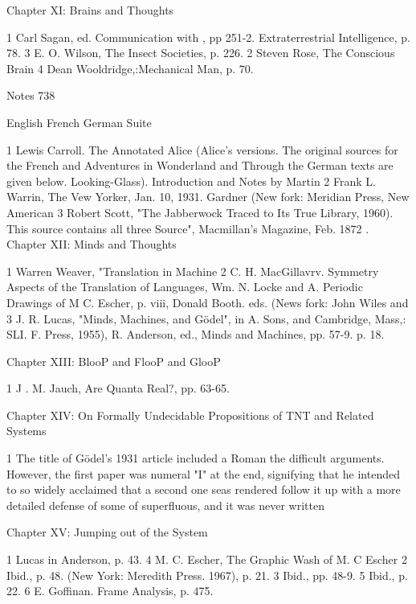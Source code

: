                                    Chapter XI: Brains and Thoughts

1 Carl Sagan, ed. Communication with                      , pp 251-2.
Extraterrestrial Intelligence, p. 78.                     3 E. O. Wilson, The Insect Societies, p. 226.
2 Steven Rose, The Conscious Brain                        4 Dean Wooldridge,:Mechanical Man, p. 70.




Notes                                                                                                 738

                                      English French German Suite

1 Lewis Carroll. The Annotated Alice (Alice's      versions. The original sources for the French and
Adventures in Wonderland and Through the           German texts are given below.
Looking-Glass). Introduction and Notes by Martin   2 Frank L. Warrin, The Vew Yorker, Jan. 10, 1931.
Gardner (New fork: Meridian Press, New American 3 Robert Scott, "The Jabberwock Traced to Its True
Library, 1960). This source contains all three     Source", Macmillan's Magazine, Feb. 1872
.
                                   Chapter XII: Minds and Thoughts

1 Warren Weaver, "Translation     in Machine          2 C. H. MacGillavrv. Symmetry Aspects of the
Translation of Languages, Wm. N. Locke and A.         Periodic Drawings of M C. Escher, p. viii,
Donald Booth. eds. (News fork: John Wiles and         3 J. R. Lucas, "Minds, Machines, and Gödel", in A.
Sons, and Cambridge, Mass,: SLI. F. Press, 1955),     R. Anderson, ed., Minds and Machines, pp. 57-9.
p. 18.

                              Chapter XIII: BlooP and FlooP and GlooP

1 J . M. Jauch, Are Quanta Real?, pp. 63-65.

                        Chapter XIV: On Formally Undecidable Propositions
                                   of TNT and Related Systems

1 The title of Gödel’s 1931 article included a Roman the difficult arguments. However, the first paper was
numeral "I" at the end, signifying that he intended to so widely acclaimed that a second one seas rendered
follow it up with a more detailed defense of some of superfluous, and it was never written

                               Chapter XV: Jumping out of the System

1 Lucas in Anderson, p. 43.                           4 M. C. Escher, The Graphic Wash of M. C Escher
2 Ibid., p. 48.                                       (New York: Meredith Press. 1967), p. 21.
3 Ibid., pp. 48-9.                                    5 Ibid., p. 22.
                                                      6 E. Goffinan. Frame Analysis, p. 475.

